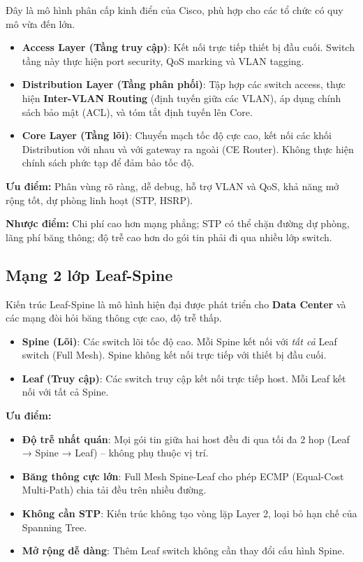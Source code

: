 Đây là mô hình phân cấp kinh điển của Cisco, phù hợp cho các tổ chức có quy mô vừa đến lớn.

\begin{itemize}
    \item \textbf{Access Layer (Tầng truy cập)}: Kết nối trực tiếp thiết bị đầu cuối. Switch tầng này thực hiện port security, QoS marking và VLAN tagging.
    \item \textbf{Distribution Layer (Tầng phân phối)}: Tập hợp các switch access, thực hiện \textbf{Inter-VLAN Routing} (định tuyến giữa các VLAN), áp dụng chính sách bảo mật (ACL), và tóm tắt định tuyến lên Core.
    \item \textbf{Core Layer (Tầng lõi)}: Chuyển mạch tốc độ cực cao, kết nối các khối Distribution với nhau và với gateway ra ngoài (CE Router). Không thực hiện chính sách phức tạp để đảm bảo tốc độ.
\end{itemize}

\textbf{Ưu điểm:} Phân vùng rõ ràng, dễ debug, hỗ trợ VLAN và QoS, khả năng mở rộng tốt, dự phòng linh hoạt (STP, HSRP).

\textbf{Nhược điểm:} Chi phí cao hơn mạng phẳng; STP có thể chặn đường dự phòng, lãng phí băng thông; độ trễ cao hơn do gói tin phải đi qua nhiều lớp switch.

\subsection{Mạng 2 lớp Leaf-Spine}

Kiến trúc Leaf-Spine là mô hình hiện đại được phát triển cho \textbf{Data Center} và các mạng đòi hỏi băng thông cực cao, độ trễ thấp.

\begin{itemize}
    \item \textbf{Spine (Lõi)}: Các switch lõi tốc độ cao. Mỗi Spine kết nối với \textit{tất cả} Leaf switch (Full Mesh). Spine không kết nối trực tiếp với thiết bị đầu cuối.
    \item \textbf{Leaf (Truy cập)}: Các switch truy cập kết nối trực tiếp host. Mỗi Leaf kết nối với tất cả Spine.
\end{itemize}

\textbf{Ưu điểm:}
\begin{itemize}
    \item \textbf{Độ trễ nhất quán}: Mọi gói tin giữa hai host đều đi qua tối đa 2 hop (Leaf → Spine → Leaf) – không phụ thuộc vị trí.
    \item \textbf{Băng thông cực lớn}: Full Mesh Spine-Leaf cho phép ECMP (Equal-Cost Multi-Path) chia tải đều trên nhiều đường.
    \item \textbf{Không cần STP}: Kiến trúc không tạo vòng lặp Layer 2, loại bỏ hạn chế của Spanning Tree.
    \item \textbf{Mở rộng dễ dàng}: Thêm Leaf switch không cần thay đổi cấu hình Spine.
\end{itemize}

